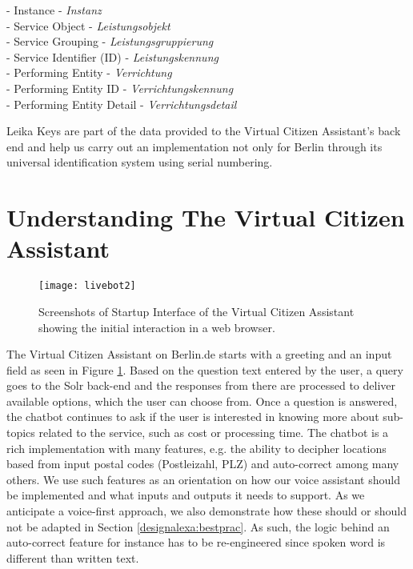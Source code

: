 \begin{flushleft}
- Instance \quad \quad \quad \quad \quad \quad \space \space  - \textit{Instanz}\\
- Service Object \quad \quad \quad  \space \space \space \space - \textit{Leistungsobjekt}\\
- Service Grouping \quad \quad \space \space \space - \textit{Leistungsgruppierung}\\
- Service Identifier (ID)   \space \space \space \space- \textit{Leistungskennung}\\
- Performing Entity \quad \quad \space \space - \textit{Verrichtung}\\
- Performing Entity ID \quad \space - \textit{Verrichtungskennung}\\
- Performing Entity Detail  - \textit{Verrichtungsdetail}\\
\end{flushleft}

Leika Keys are part of the data provided to the Virtual Citizen Assistant's back end and help us carry out an implementation not only for Berlin through its universal identification system using serial numbering.


\section{Understanding The Virtual Citizen Assistant}




\begin{figure}[H]
	\centering
	\caption[Startup Interface of the Virtual Citizen Assistant]{Screenshots of Startup Interface of the Virtual Citizen Assistant showing the initial interaction in a web browser.}
	\label{vca:start}
	\texttt{[image: livebot2]}
\end{figure}


The Virtual Citizen Assistant on Berlin.de starts with a greeting and an input field as seen in Figure \ref{vca:start}. Based on the question text entered by the user, a query goes to the Solr back-end and the responses from there are processed to deliver available options, which the user can choose from.
Once a question is answered, the chatbot continues to ask if the user is interested in knowing more about sub-topics related to the service, such as cost or processing time.
The chatbot is a rich implementation with many features, e.g. the ability to decipher locations based from input postal codes (Postleizahl, PLZ) and auto-correct among many others. We use such %
features as an orientation on how our voice assistant should be implemented and what inputs and outputs it needs to support. As we anticipate a voice-first approach, we also demonstrate how these should or should not be adapted in Section \ref{designalexa:bestprac}. As such, the logic behind an auto-correct feature for instance has to be re-engineered since spoken word is different than written text.\\

